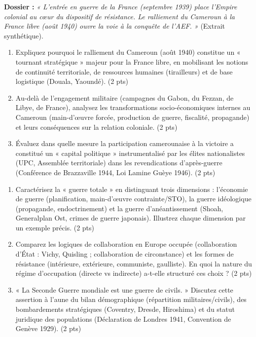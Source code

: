 \documentclass[11pt]{article}
\begin{document}
\begin{exercice}
    \textbf{Dossier :} \textit{« L'entrée en guerre de la France (septembre 1939) place l'Empire colonial au cœur du dispositif de résistance. Le ralliement du Cameroun à la France libre (août 1940) ouvre la voie à la conquête de l'AEF. »} (Extrait synthétique).
    \begin{enumerate}
        \item Expliquez pourquoi le ralliement du Cameroun (août 1940) constitue un « tournant stratégique » majeur pour la France libre, en mobilisant les notions de continuité territoriale, de ressources humaines (tirailleurs) et de base logistique (Douala, Yaoundé). (2 pts)
        \item Au-delà de l'engagement militaire (campagnes du Gabon, du Fezzan, de Libye, de France), analysez les transformations socio-économiques internes au Cameroun (main-d'œuvre forcée, production de guerre, fiscalité, propagande) et leurs conséquences sur la relation coloniale. (2 pts)
        \item Évaluez dans quelle mesure la participation camerounaise à la victoire a constitué un « capital politique » instrumentalisé par les élites nationalistes (UPC, Assemblée territoriale) dans les revendications d'après-guerre (Conférence de Brazzaville 1944, Loi Lamine Guèye 1946). (2 pts)
    \end{enumerate}
\end{exercice}

\begin{exercice}
    \begin{enumerate}
        \item Caractérisez la « guerre totale » en distinguant trois dimensions : l'économie de guerre (planification, main-d'œuvre contrainte/STO), la guerre idéologique (propagande, endoctrinement) et la guerre d'anéantissement (Shoah, Generalplan Ost, crimes de guerre japonais). Illustrez chaque dimension par un exemple précis. (2 pts)
        \item Comparez les logiques de collaboration en Europe occupée (collaboration d'État : Vichy, Quisling ; collaboration de circonstance) et les formes de résistance (intérieure, extérieure, communiste, gaulliste). En quoi la nature du régime d'occupation (directe vs indirecte) a-t-elle structuré ces choix ? (2 pts)
        \item « La Seconde Guerre mondiale est une guerre de civils. » Discutez cette assertion à l'aune du bilan démographique (répartition militaires/civils), des bombardements stratégiques (Coventry, Dresde, Hiroshima) et du statut juridique des populations (Déclaration de Londres 1941, Convention de Genève 1929). (2 pts)
    \end{enumerate}
\end{exercice}
\end{document}
